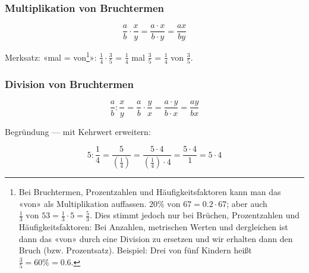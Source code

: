 


\subsubsection{Multiplikation von Bruchtermen}

\begin{gesetz}{}{}
$$\frac{a}{b}\cdot\frac{x}{y} = \frac{a\cdot x}{b\cdot y} = \frac{ax}{by}$$
\end{gesetz}

Merksatz:
«mal = von\footnote{Bei Bruchtermen, Prozentzahlen und Häufigkeitsfaktoren kann man das «von» als Multiplikation auffassen. $20\% \textrm{ von } 67 = 0.2 \cdot{} 67$; aber auch $\frac{1}{3} \textrm{ von } 53 = \frac{1}{3}\cdot{5}=\frac{5}{3}$. Dies stimmt jedoch nur bei Brüchen, Prozentzahlen und Häufigkeitsfaktoren: Bei Anzahlen, metrischen Werten und dergleichen ist dann das «von» durch eine Division zu ersetzen und wir erhalten dann den Bruch (bzw. Prozentsatz). Beispiel: Drei von fünf Kindern heißt $\frac{3}{5} = 60\% = 0.6$.}»:
$\frac{1}{4} \cdot \frac{3}{5}$ = $\frac{1}{4}$ mal $\frac{3}{5}$ = $\frac{1}{4}$ von $\frac{3}{5}$.

\subsubsection{Division von Bruchtermen}
\begin{gesetz}{}{}
$$\frac{a}{b} : \frac{x}{y}=\frac{a}{b}\cdot\frac{y}{x} = \frac{a\cdot y}{b\cdot x} = \frac{ay}{bx}$$
\end{gesetz}

Begründung — mit Kehrwert erweitern:

$$5 : \frac{1}{4} =
\frac{5}{\left(\frac{1}{4}\right)} =
\frac{5\cdot{}4}{\left(\frac{1}{4}\right)\cdot{}4} =
\frac{5\cdot{}4}{1} = 5 \cdot{} 4$$
\newpage



\newpage
